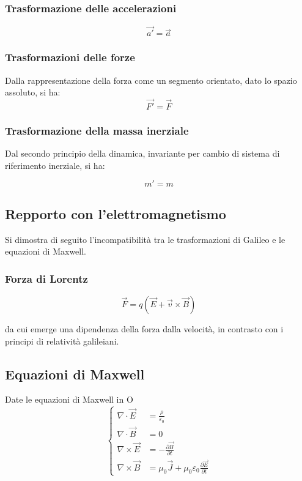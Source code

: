 \documentclass{article}
\begin{document}
\subsubsection{
    Trasformazione delle accelerazioni
}
\begin{equation}
    \vec{a'} = \vec{a}
\end{equation}

\subsubsection{Trasformazioni delle forze}
Dalla rappresentazione della forza come un segmento orientato, dato lo spazio assoluto, si ha:
\begin{equation}
    \vec{F'} = \vec{F}
\end{equation}

\subsubsection{Trasformazione della massa inerziale}
Dal secondo principio della dinamica, invariante per cambio di sistema di riferimento inerziale, si ha:

\begin{equation}
    m' = m
\end{equation}


\subsection{Repporto con l'elettromagnetismo}
Si dimostra di seguito l'incompatibilità tra le trasformazioni di Galileo e le equazioni di Maxwell.

\subsubsection{Forza di Lorentz}
\begin{equation}
    \vec{F} = q(\vec{E} + \vec{v} \times \vec{B})
\end{equation}

da cui emerge una dipendenza della forza dalla velocità, in contrasto con i principi di relatività galileiani.

\subsection*{Equazioni di Maxwell}
Date le equazioni di Maxwell in O
\begin{equation}
    \left\{
    \begin{aligned}
        \nabla \cdot \vec{E}  & = \frac{\rho}{\varepsilon_0}                                              \\
        \nabla \cdot \vec{B}  & = 0                                                                       \\
        \nabla \times \vec{E} & = -\frac{\partial \vec{B}}{\partial t}                                    \\
        \nabla \times \vec{B} & = \mu_0 \vec{J} + \mu_0 \varepsilon_0 \frac{\partial \vec{E}}{\partial t}
    \end{aligned}
    \right.
\end{equation}
\end{document}
